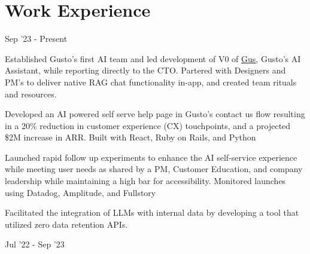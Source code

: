 \documentclass[]{deedy-resume-openfont}
\begin{document}

\begin{minipage}[t]{0.95\textwidth} 
\raggedright

\section{Work Experience}


\subtitle{Engineer, AI Platform}{Sep '23 - Present}


\vspace{\topsep} %
\begin{tightemize}
\item Established Gusto's first AI team and led development of V0 of \underline{\href {https://gusto.com/company-news/gus-ai-assistant}{Gus}}, Gusto's AI Assistant, while reporting directly to the CTO. Partered with Designers and PM's to deliver native RAG chat functionality in-app, and created team rituals and resources.
\item Developed an AI powered self serve help page in Gusto's contact us flow resulting in a 20\% reduction in customer experience (CX) touchpoints, and a projected \$2M increase in ARR. Built with React, Ruby on Rails, and Python
\item Launched rapid follow up experiments to enhance the AI self-service experience while meeting user needs as shared by a PM, Customer Education, and company leadership while maintaining a high bar for accessibility. Monitored launches using Datadog, Amplitude, and Fullstory
\item Facilitated the integration of LLMs with internal data by developing a tool that utilized zero data retention APIs.
\end{tightemize}
\vspace{\topsep} %
\subtitle{Full Stack Engineer, Help Foundation}{Jul '22 - Sep '23}


\end{minipage}
\end{document}
